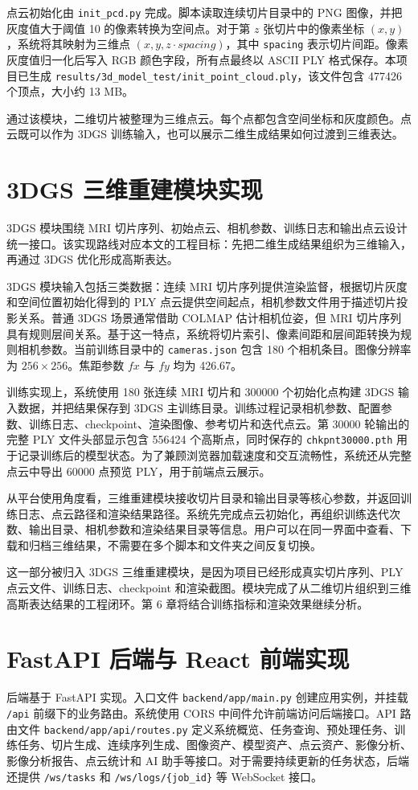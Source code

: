 点云初始化由 \texttt{init\_pcd.py} 完成。脚本读取连续切片目录中的 PNG 图像，并把灰度值大于阈值 10 的像素转换为空间点。对于第 $z$ 张切片中的像素坐标 $(x,y)$，系统将其映射为三维点 $(x,y,z\cdot spacing)$，其中 \texttt{spacing} 表示切片间距。像素灰度值归一化后写入 RGB 颜色字段，所有点最终以 ASCII PLY 格式保存。本项目已生成 \texttt{results/3d\_model\_test/init\_point\_cloud.ply}，该文件包含 477426 个顶点，大小约 13 MB。

通过该模块，二维切片被整理为三维点云。每个点都包含空间坐标和灰度颜色。点云既可以作为 3DGS 训练输入，也可以展示二维生成结果如何过渡到三维表达。

\section{3DGS 三维重建模块实现}
3DGS 模块围绕 MRI 切片序列、初始点云、相机参数、训练日志和输出点云设计统一接口。该实现路线对应本文的工程目标：先把二维生成结果组织为三维输入，再通过 3DGS 优化形成高斯表达。

3DGS 模块输入包括三类数据：连续 MRI 切片序列提供渲染监督，根据切片灰度和空间位置初始化得到的 PLY 点云提供空间起点，相机参数文件用于描述切片投影关系。普通 3DGS 场景通常借助 COLMAP 估计相机位姿，但 MRI 切片序列具有规则层间关系。基于这一特点，系统将切片索引、像素间距和层间距转换为规则相机参数。当前训练目录中的 \texttt{cameras.json} 包含 180 个相机条目。图像分辨率为 $256\times256$。焦距参数 $fx$ 与 $fy$ 均为 426.67。

训练实现上，系统使用 180 张连续 MRI 切片和 300000 个初始化点构建 3DGS 输入数据，并把结果保存到 3DGS 主训练目录。训练过程记录相机参数、配置参数、训练日志、checkpoint、渲染图像、参考切片和迭代点云。第 30000 轮输出的完整 PLY 文件头部显示包含 556424 个高斯点，同时保存的 \texttt{chkpnt30000.pth} 用于记录训练后的模型状态。为了兼顾浏览器加载速度和交互流畅性，系统还从完整点云中导出 60000 点预览 PLY，用于前端点云展示。

从平台使用角度看，三维重建模块接收切片目录和输出目录等核心参数，并返回训练日志、点云路径和渲染结果路径。系统先完成点云初始化，再组织训练迭代次数、输出目录、相机参数和渲染结果目录等信息。用户可以在同一界面中查看、下载和归档三维结果，不需要在多个脚本和文件夹之间反复切换。

这一部分被归入 3DGS 三维重建模块，是因为项目已经形成真实切片序列、PLY 点云文件、训练日志、checkpoint 和渲染截图。模块完成了从二维切片组织到三维高斯表达结果的工程闭环。第 6 章将结合训练指标和渲染效果继续分析。

\section{FastAPI 后端与 React 前端实现}
后端基于 FastAPI 实现。入口文件 \texttt{backend/app/main.py} 创建应用实例，并挂载 \texttt{/api} 前缀下的业务路由。系统使用 CORS 中间件允许前端访问后端接口。API 路由文件 \texttt{backend/app/api/routes.py} 定义系统概览、任务查询、预处理任务、训练任务、切片生成、连续序列生成、图像资产、模型资产、点云资产、影像分析、影像分析报告、点云统计和 AI 助手等接口。对于需要持续更新的任务状态，后端还提供 \texttt{/ws/tasks} 和 \texttt{/ws/logs/\{job\_id\}} 等 WebSocket 接口。

